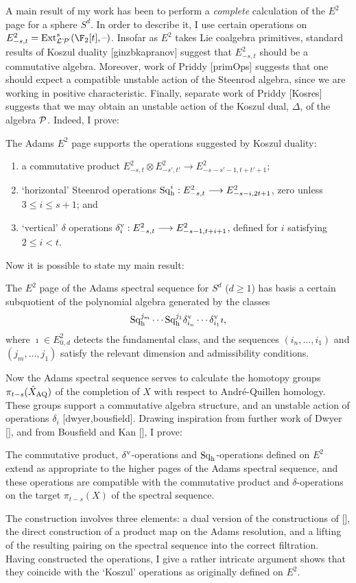 \documentclass[11pt]{article}
\newcommand{\Sq}{\mathrm{Sq}}
\begin{document}
A main result of my work has been to perform a \emph{complete} calculation of the $E^2$ page for a sphere $S^d$. In order to describe it, I use certain operations on $E^2_{-s,t}=\Ext^s_{\calL\hat{\,}\calP\hat{\,}}(\F_2[t],\DASH)$. Insofar as $E^2$ takes Lie coalgebra primitives, standard results of Koszul duality [ginzbkapranov] suggest that $E^2_{-s,t}$  should be a commutative algebra. Moreover, work of Priddy [primOps] suggests that one should expect a compatible unstable action of the Steenrod algebra, since we are working in positive characteristic. Finally, separate work of Priddy [Kosres] suggests that we may obtain an unstable action of the Koszul dual, $\Delta$, of the algebra $\calP$. Indeed, I prove:
\begin{thm*}
The Adams $E^2$ page supports the operations suggested by Koszul duality:
\begin{enumerate}\squishlist
\setlength{\parindent}{.25in}
\item a commutative product $E^2_{-s,t}\otimes E^2_{-s',t'}\to E^2_{-s-s'-1,t+t'+1}$;
\item `horizontal' Steenrod operations $\Sq^i_\textup{h}:E^2_{-s,t}\to E^2_{-s-i,2t+1}$, zero unless $3\leq i\leq s+1$; and
\item `vertical' $\delta$ operations $\delta_i^\textup{v}:E^2_{-s,t}\to E^2_{-s-1,t+i+1}$, defined for $i$ satisfying $2\leq i<t$.
\end{enumerate}
\end{thm*}
Now it is possible to state my main result:
\begin{thm*}
The $E^2$ page of the Adams spectral sequence for $S^d$ ($d\geq1$) has basis a certain subquotient of the polynomial algebra generated by the classes
\[\Sq_\textup{h}^{j_m}\cdots \Sq_\textup{h}^{j_1}\delta^\textup{v}_{i_n}\cdots \delta^\textup{v}_{i_1}\imath,\]
where $\imath\in E^2_{0,d}$ detects the fundamental class, and the sequences $(i_n,\ldots,i_1)$ and $(j_m,\ldots,j_1)$ satisfy the relevant dimension and admissibility conditions. 
\end{thm*}
Now the Adams spectral sequence serves to calculate the homotopy groups $\pi_{t-s}(\hat X_\textup{AQ})$ of the  completion of $X$ with respect to Andr\'e-Quillen homology. These groups support a commutative algebra structure, and an unstable action of operations $\delta_i$ [dwyer,bousfield]. Drawing inspiration from further work of Dwyer [], and from Bousfield and Kan [], I prove:
\begin{thm*}
The commutative product, $\delta^\textup{v}$-operations and $\Sq_\textup{h}$-operations defined on $E^2$ extend as appropriate to the higher pages of the Adams spectral sequence, and these operations are compatible with the commutative product and $\delta$-operations on the target $\pi_{t-s}(X)$ of the spectral sequence.
\end{thm*}
The construction involves three elements: a dual version of the constructions of [], the direct construction of a product map on the Adams resolution, and a lifting of the resulting pairing on the spectral sequence into the correct filtration. Having constructed the operations, I give a rather intricate argument shows that they coincide with the `Koszul' operations as originally defined on $E^2$.
\end{document}
